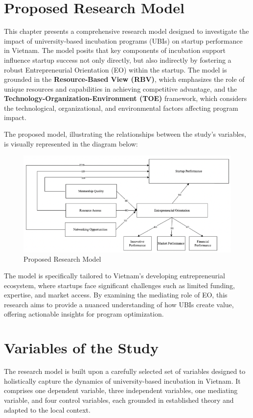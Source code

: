 \documentclass[../Main.tex]{subfiles}
\begin{document}
	\section{Proposed Research Model}
    This chapter presents a comprehensive research model designed to investigate the impact of university-based incubation programs (UBIs) on startup performance in Vietnam. The model posits that key components of incubation support influence startup success not only directly, but also indirectly by fostering a robust Entrepreneurial Orientation (EO) within the startup. The model is grounded in the \textbf{Resource-Based View (RBV)}, which emphasizes the role of unique resources and capabilities in achieving competitive advantage, and the \textbf{Technology-Organization-Environment (TOE)} framework, which considers the technological, organizational, and environmental factors affecting program impact.

    The proposed model, illustrating the relationships between the study's variables, is visually represented in the diagram below:
    \begin{figure}[H]
        \centering
        \includegraphics[width=\textwidth]{Figure/research_model.png}
        \caption{Proposed Research Model}
        \label{fig:research_model}
    \end{figure}

    The model is specifically tailored to Vietnam's developing entrepreneurial ecosystem, where startups face significant challenges such as limited funding, expertise, and market access. By examining the mediating role of EO, this research aims to provide a nuanced understanding of how UBIs create value, offering actionable insights for program optimization.

    \section{Variables of the Study}
    The research model is built upon a carefully selected set of variables designed to holistically capture the dynamics of university-based incubation in Vietnam. It comprises one dependent variable, three independent variables, one mediating variable, and four control variables, each grounded in established theory and adapted to the local context.
\end{document}
